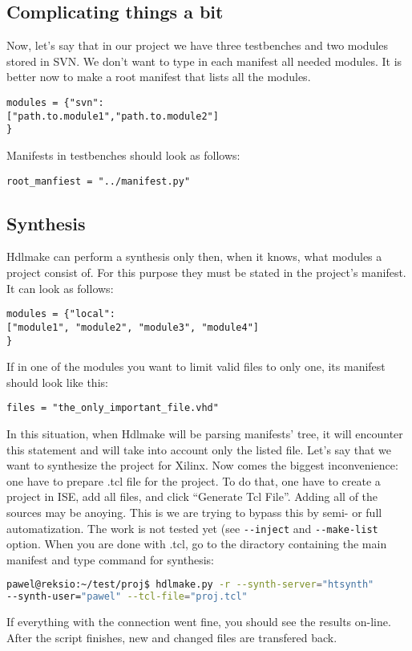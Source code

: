 \documentclass[a4paper,11pt]{article}
\begin{document}
\subsection*{Complicating things a bit}
Now, let's say that in our project we have three testbenches and two modules stored in SVN. We don't want to type in each manifest all needed modules. It is better now to make a root manifest that lists all the modules.
\begin{lstlisting}
modules = {"svn":
["path.to.module1","path.to.module2"]
}
\end{lstlisting}
Manifests in testbenches should look as follows:
\begin{lstlisting}
root_manfiest = "../manifest.py"
\end{lstlisting}
\subsection{Synthesis}
Hdlmake can perform a synthesis only then, when it knows, what modules a project consist of. For this purpose they must be stated in the project's manifest.
It can look as follows:
\begin{lstlisting}
modules = {"local":
["module1", "module2", "module3", "module4"]
}
\end{lstlisting}
If in one of the modules you want to limit valid files to only one, its manifest should look like this:
\begin{lstlisting}
files = "the_only_important_file.vhd"
\end{lstlisting}
In this situation, when Hdlmake will be parsing manifests' tree, it will encounter this statement and will take into account only the listed file.
Let's say that we want to synthesize the project for Xilinx. Now comes the biggest inconvenience: one have to prepare .tcl file for the project. To do that, one have to create a project in ISE, add all files, and click ``Generate Tcl File''. Adding all of the sources may be anoying. This is we are trying to bypass this by semi- or full automatization. The work is not tested yet (see \verb!--inject! and \verb!--make-list! option.
When you are done with .tcl, go to the diractory containing the main manifest and type command for synthesis:
\begin{lstlisting}[language=bash]
pawel@reksio:~/test/proj$ hdlmake.py -r --synth-server="htsynth" 
--synth-user="pawel" --tcl-file="proj.tcl"
\end{lstlisting}
If everything with the connection went fine, you should see the results on-line. After the script finishes, new and changed files are transfered back.
\end{document}
